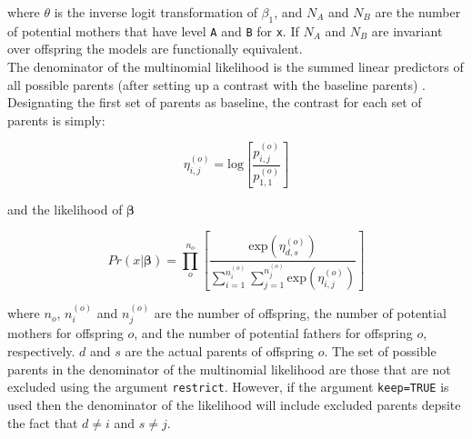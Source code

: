 \documentclass{article}
\begin{document}
where $\theta$ is the inverse logit transformation of $\beta_{1}$, and $N_{A}$ and $N_{B}$ are the number of potential mothers that have level \texttt{A} and \texttt{B} for \texttt{x}. If $N_{A}$ and $N_{B}$ are invariant over offspring the models are functionally equivalent.\\

The denominator of the multinomial likelihood is the summed linear predictors of all possible parents (after setting up a contrast with the baseline parents) \citep{Smouse.1999}.  Designating the first set of parents as baseline, the contrast for each set of parents is simply:

\begin{equation}
\eta^{(o)}_{i,j}  = \textrm{log}\left[\frac{p^{(o)}_{i,j}}{p^{(o)}_{1,1}}\right]
\end{equation}

and the likelihood of $\bm{\beta}$

\begin{equation}
Pr(x|\bm{\beta})  = \prod^{n_{o}}_{o}\left[\frac{\textrm{exp}(\eta^{(o)}_{d,s})}{\sum^{n^{(o)}_{i}}_{i=1}\sum^{n^{(o)}_{j}}_{j=1}\textrm{exp}(\eta^{(o)}_{i,j})}\right] 
\end{equation}

where $n_{o}$, $n^{(o)}_{i}$ and $n^{(o)}_{j}$ are the number of offspring, the number of potential mothers for offspring $o$, and the number of potential fathers for offspring $o$, respectively.  $d$ and $s$ are the actual parents of offspring $o$. The set of possible parents  in the denominator of the multinomial likelihood are those that are not excluded using the argument \texttt{restrict}. However, if the argument \texttt{keep=TRUE} is used then the denominator of the likelihood will include excluded parents depsite the fact that $d \neq i$ and $s \neq j$.




\end{document}

